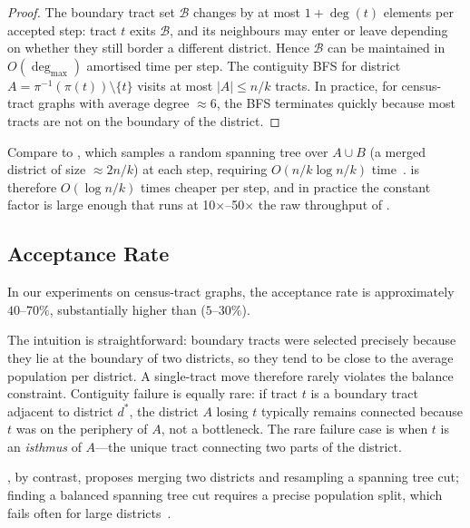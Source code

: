 \begin{proof}
The boundary tract set $\mathcal{B}$ changes by at most $1 + \deg(t)$
elements per accepted step: tract $t$ exits $\mathcal{B}$, and its
neighbours may enter or leave depending on whether they still border a
different district.
Hence $\mathcal{B}$ can be maintained in $O(\deg_{\max})$ amortised time
per step.
The contiguity BFS for district $A = \pi^{-1}(\pi(t)) \setminus \{t\}$
visits at most $|A| \leq n/k$ tracts.
In practice, for census-tract graphs with average degree $\approx 6$,
the BFS terminates quickly because most tracts are not on the boundary
of the district.
\end{proof}

Compare to \recom{}, which samples a random spanning tree over $A \cup B$
(a merged district of size $\approx 2n/k$) at each step, requiring
$O(n/k \log n/k)$ time~\citep{deford2021}.
\flip{} is therefore $O(\log n/k)$ times cheaper per step, and in practice
the constant factor is large enough that \flip{} runs at 10$\times$--50$\times$
the raw throughput of \recom{}.

\subsection{Acceptance Rate}

\begin{proposition}
\label{prop:accept}
In our experiments on census-tract graphs, the \flip{} acceptance rate
is approximately $40$--$70\%$, substantially higher than \recom{} ($5$--$30\%$).
\end{proposition}

The intuition is straightforward: boundary tracts were selected precisely
because they lie at the boundary of two districts, so they tend to be close
to the average population per district.
A single-tract move therefore rarely violates the balance constraint.
Contiguity failure is equally rare: if tract $t$ is a boundary tract adjacent
to district $d^*$, the district $A$ losing $t$ typically remains connected
because $t$ was on the periphery of $A$, not a bottleneck.
The rare failure case is when $t$ is an \emph{isthmus} of $A$---the unique
tract connecting two parts of the district.

\recom{}, by contrast, proposes merging two districts and resampling a
spanning tree cut; finding a balanced spanning tree cut requires a precise
population split, which fails often for large districts~\citep{deford2021}.

